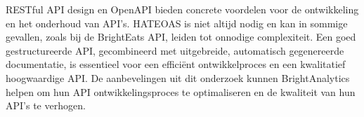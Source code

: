 \bigskip

RESTful API design en OpenAPI bieden concrete voordelen voor de ontwikkeling en het onderhoud van API's. HATEOAS is niet altijd nodig en kan in sommige gevallen, zoals bij de BrightEats API, leiden tot onnodige complexiteit. Een goed gestructureerde API, gecombineerd met uitgebreide, automatisch gegenereerde documentatie, is essentieel voor een efficiënt ontwikkelproces en een kwalitatief hoogwaardige API. De aanbevelingen uit dit onderzoek kunnen BrightAnalytics helpen om hun API ontwikkelingsproces te optimaliseren en de kwaliteit van hun API's te verhogen.
